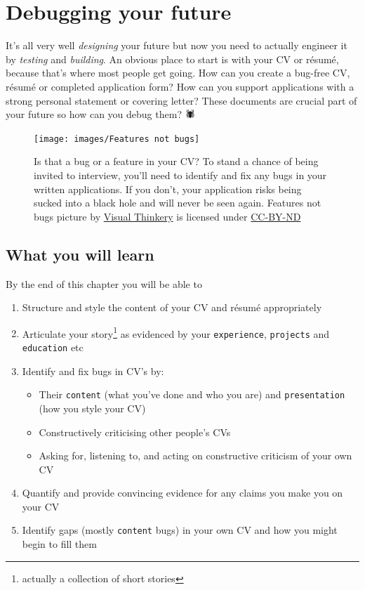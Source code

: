 \documentclass[
]{book}
\providecommand{\tightlist}{%
  \setlength{\itemsep}{0pt}\setlength{\parskip}{0pt}}
\begin{document}
\hypertarget{debugging}{%
\chapter{Debugging your future}\label{debugging}}

It's all very well \emph{designing} your future but now you need to actually engineer it by \emph{testing} and \emph{building}. An obvious place to start is with your CV or résumé, because that's where most people get going. How can you create a bug-free CV, résumé or completed application form? How can you support applications with a strong personal statement or covering letter? These documents are crucial part of your future so how can you debug them? 🕷

\begin{figure}

{\centering \texttt{[image: images/Features not bugs]} 

}

\caption{Is that a bug or a feature in your CV? To stand a chance of being invited to interview, you'll need to identify and fix any bugs in your written applications. If you don't, your application risks being sucked into a black hole and will never be seen again. Features not bugs picture by \href{https://visualthinkery.com}{Visual Thinkery} is licensed under \href{https://creativecommons.org/licenses/by-nd/4.0/}{CC-BY-ND}}\label{fig:bugfeature-fig}
\end{figure}



\hypertarget{ilo7}{%
\section{What you will learn}\label{ilo7}}

By the end of this chapter you will be able to

\begin{enumerate}
\def\labelenumi{\arabic{enumi}.}
\tightlist
\item
  Structure and style the content of your CV and résumé appropriately
\item
  Articulate your story\footnote{actually a collection of short stories} as evidenced by your \texttt{experience}, \texttt{projects} and \texttt{education} etc
\item
  Identify and fix bugs in CV's by:

  \begin{itemize}
  \tightlist
  \item
    Their \texttt{content} (what you've done and who you are) and \texttt{presentation} (how you style your CV)
  \item
    Constructively criticising other people's CVs
  \item
    Asking for, listening to, and acting on constructive criticism of your own CV
  \end{itemize}
\item
  Quantify and provide convincing evidence for any claims you make you on your CV
\item
  Identify gaps (mostly \texttt{content} bugs) in your own CV and how you might begin to fill them
\end{enumerate}
\end{document}
